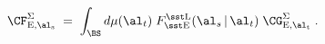 \begin{equation}
\CF_{\rm E,\al_s}^{\Sigma}\;=\;\int_{\BS}d\mu(\al_t)\;
F_{\rm\sst E}^{\rm\sst L}(\al_s\,|\,\al_t)\;\CG_{\rm E,\al_t}^{\Sigma}\; .
\end{equation}

